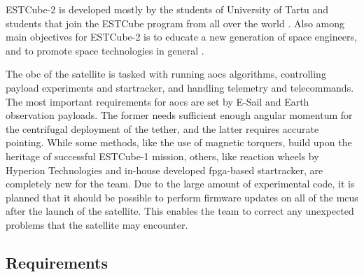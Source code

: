 ESTCube-2 is developed mostly by the students of University of Tartu and students that join the ESTCube program from all over the world \cite{Ehrpais2016}. Also among main objectives for ESTCube-2 is to educate a new generation of space engineers, and to promote space technologies in general \cite{Iakubivskyi2016}.

The \gls{obc} of the satellite is tasked with running \gls{aocs} algorithms, controlling payload experiments and startracker, and handling telemetry and telecommands. The most important requirements for \gls{aocs} are set by E-Sail and Earth observation payloads. The former needs sufficient enough angular momentum for the centrifugal deployment of the tether, and the latter requires accurate pointing. While some methods, like the use of magnetic torquers, build upon the heritage of successful ESTCube-1 mission, others, like reaction wheels by Hyperion Technologies and in-house developed \gls{fpga}-based startracker, are completely new for the team. Due to the large amount of experimental code, it is planned that it should be possible to perform firmware updates on all of the \gls{mcu}s after the launch of the satellite. This enables the team to correct any unexpected problems that the satellite may encounter. \cite{Ehrpais2016}

\subsection{Requirements}
